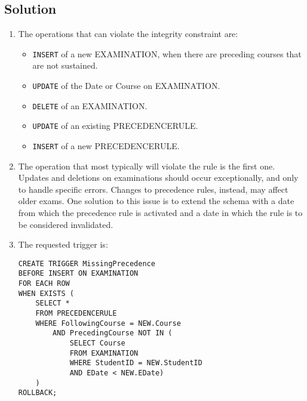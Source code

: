 \subsection*{Solution}
\begin{enumerate}
    \item The operations that can violate the integrity constraint are: 
        \begin{itemize}
            \item \texttt{INSERT} of a new EXAMINATION, when there are preceding courses that are not sustained.
            \item \texttt{UPDATE} of the Date or Course on EXAMINATION.
            \item \texttt{DELETE} of an EXAMINATION.
            \item \texttt{UPDATE} of an existing PRECEDENCERULE.
            \item \texttt{INSERT} of a new PRECEDENCERULE.
        \end{itemize}
    \item The operation that most typically will violate the rule is the first one.
        Updates and deletions on examinations should occur exceptionally, and only to handle specific errors. 
        Changes to precedence rules, instead, may affect older exams.
        One solution to this issue is to extend the schema with a date from which the precedence rule is activated and a date in which the rule is to be considered invalidated.
    \item The requested trigger is: 
        \begin{lstlisting}[style=SQL]
CREATE TRIGGER MissingPrecedence
BEFORE INSERT ON EXAMINATION
FOR EACH ROW
WHEN EXISTS ( 
    SELECT *
    FROM PRECEDENCERULE
    WHERE FollowingCourse = NEW.Course 
        AND PrecedingCourse NOT IN (
            SELECT Course
            FROM EXAMINATION
            WHERE StudentID = NEW.StudentID
            AND EDate < NEW.EDate) 
    )
ROLLBACK;
        \end{lstlisting}
\end{enumerate}